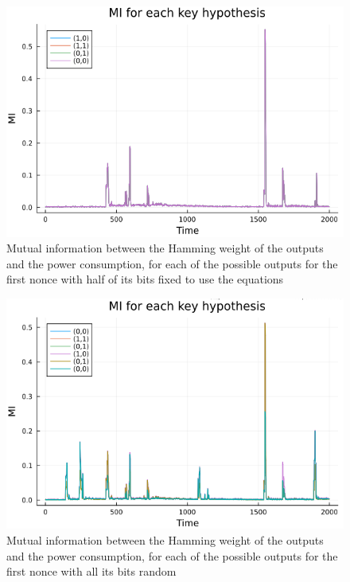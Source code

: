 \documentclass[a4paper,11pt,twocolumn]{article}
\begin{document}
	\begin{figure}[h]
		\centering
		\includegraphics[scale=0.3]{nonces_half_fixed}
		\caption{Mutual information between the Hamming weight of the outputs and the power consumption, for each of the possible outputs for the first nonce with half of its bits fixed to use the equations}
		\label{half_fixed}
	\end{figure}
	
	\begin{figure}[h]
		\centering
		\includegraphics[scale=0.3]{nonces_alea}
		\caption{Mutual information between the Hamming weight of the outputs and the power consumption, for each of the possible outputs for the first nonce with all its bits random}
		\label{all_alea}
	\end{figure}
	
\end{document}
